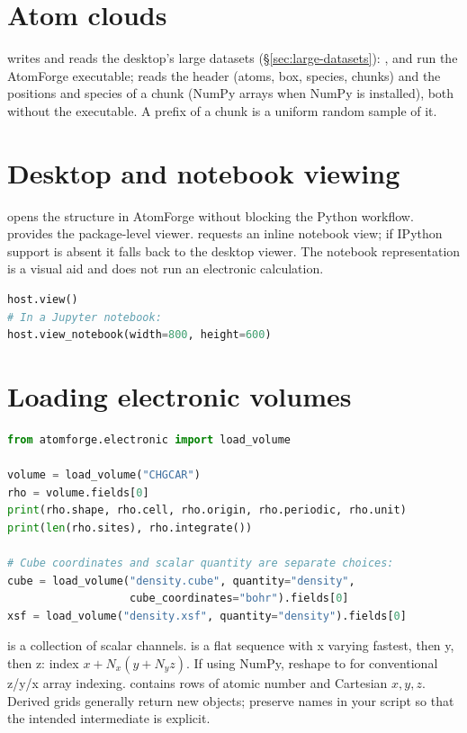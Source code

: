 \section{Atom clouds}
 writes and reads the desktop's large datasets (\S\ref{sec:large-datasets}): ,  and  run the AtomForge executable;  reads the header (atoms, box, species, chunks) and  the positions and species of a chunk (NumPy arrays when NumPy is installed), both without the executable. A prefix of a chunk is a uniform random sample of it.

\section{Desktop and notebook viewing}
 opens the structure in AtomForge without blocking the Python workflow.  provides the package-level viewer.  requests an inline notebook view; if IPython support is absent it falls back to the desktop viewer. The notebook representation is a visual aid and does not run an electronic calculation.

\begin{lstlisting}[language=Python]
host.view()
# In a Jupyter notebook:
host.view_notebook(width=800, height=600)
\end{lstlisting}

\section{Loading electronic volumes}
\begin{lstlisting}[language=Python]
from atomforge.electronic import load_volume

volume = load_volume("CHGCAR")
rho = volume.fields[0]
print(rho.shape, rho.cell, rho.origin, rho.periodic, rho.unit)
print(len(rho.sites), rho.integrate())

# Cube coordinates and scalar quantity are separate choices:
cube = load_volume("density.cube", quantity="density",
                   cube_coordinates="bohr").fields[0]
xsf = load_volume("density.xsf", quantity="density").fields[0]
\end{lstlisting}
 is a collection of scalar channels.  is a flat sequence with x varying fastest, then y, then z: index $x+N_x(y+N_yz)$. If using NumPy, reshape to  for conventional z/y/x array indexing.  contains rows of atomic number and Cartesian $x,y,z$. Derived grids generally return new objects; preserve names in your script so that the intended intermediate is explicit.

